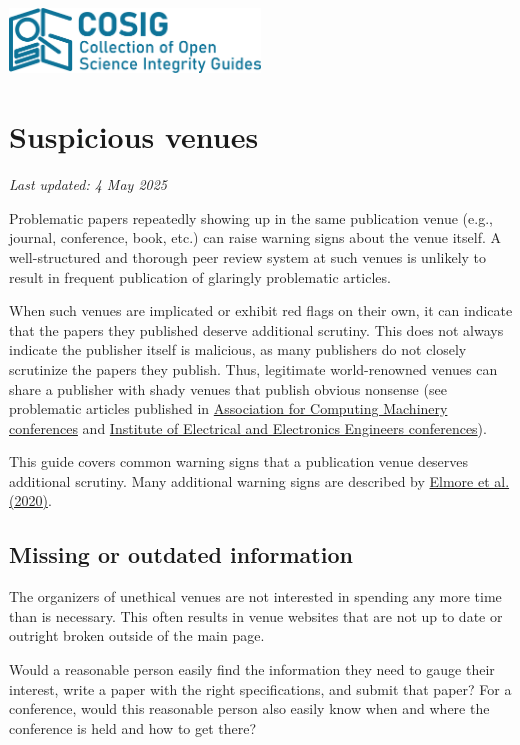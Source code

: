 \documentclass[letterpaper, 12pt]{article}
\begin{document}
\flushleft
\includegraphics[width=0.5\textwidth]{img/home/241017_final_logo_mockup.png}

\section*{Suspicious venues}
\textit{Last updated: 4 May 2025}

Problematic papers repeatedly showing up in the same publication venue (e.g., journal, conference, book, etc.) can raise warning signs about the venue itself. A well-structured and thorough peer review system at such venues is unlikely to result in frequent publication of glaringly problematic articles.

When such venues are implicated or exhibit red flags on their own, it can indicate that the papers they published deserve additional scrutiny.
This does not always indicate the publisher itself is malicious, as many publishers do not closely scrutinize the papers they publish.
Thus, legitimate world-renowned venues can share a publisher with shady venues that publish obvious nonsense (see problematic articles published in \href{https://solalpirelli.github.io/2023/01/25/troubling-acm-venues.html}{Association for Computing Machinery conferences} and \href{https://deevybee.blogspot.com/2025/02/ieee-has-pseudoscience-problem.html}{Institute of Electrical and Electronics Engineers conferences}).

This guide covers common warning signs that a publication venue deserves additional scrutiny. Many additional warning signs are described by \href{https://doi.org/10.1177/0192623320920209}{Elmore et al. (2020)}.

\subsection*{Missing or outdated information}

The organizers of unethical venues are not interested in spending any more time than is necessary.
This often results in venue websites that are not up to date or outright broken outside of the main page.

Would a reasonable person easily find the information they need to gauge their interest,
write a paper with the right specifications, and submit that paper?
For a conference, would this reasonable person also easily know when and where the conference is held and how to get there?
\end{document}
